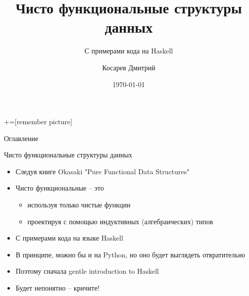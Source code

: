\documentclass[aspectratio=169
  , xcolor={svgnames}
  , hyperref=
      { colorlinks
      , urlcolor=DarkBlue 
      }  
  , russian  %
  ]{beamer}
\title[PFDS с примерами на Haskell]{Чисто функциональные структуры данных}
\subtitle{С примерами кода на Haskell}
\author{Косарев Дмитрий }
\institute{матмех СПбГУ}
\date{\today}
\theoremstyle{exerciseStyle1}
\begin{document}
\maketitle

+=[remember picture] 

\everymath{\displaystyle}

\begin{frame}{Оглавление}
  \tableofcontents
\end{frame}

\begin{frame}[fragile]{Чисто функциональные структуры данных}
\begin{itemize}
  \item Следуя книге Okasaki "Pure Functional Data Structures"
  \item Чисто функциональные -- это 
    \begin{itemize}
      \item используя только чистые функции
      \item проектируя с помощью индуктивных (алгебраических) типов
    \end{itemize}
  \item С примерами кода на языке Haskell
  \item В принципе, можно бы и на Python, но оно будет выглядеть отвратительно
  \item Поэтому сначала gentle introduction to Haskell \textcopyright\vspace{.5cm}
  
  \item Будет непонятно -- кричите!
\end{itemize}
\end{frame}

{
\begin{frame}
\end{frame}
}
\end{document}
